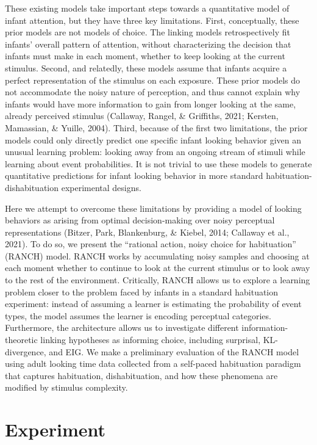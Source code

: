 \documentclass[10pt, letterpaper]{article}
\begin{document}
These existing models take important steps towards a quantitative model
of infant attention, but they have three key limitations. First,
conceptually, these prior models are not models of choice. The linking
models retrospectively fit infants' overall pattern of attention,
without characterizing the decision that infants must make in each
moment, whether to keep looking at the current stimulus. Second, and
relatedly, these models assume that infants acquire a perfect
representation of the stimulus on each exposure. These prior models do
not accommodate the noisy nature of perception, and thus cannot explain
why infants would have more information to gain from longer looking at
the same, already perceived stimulus (Callaway, Rangel, \& Griffiths,
2021; Kersten, Mamassian, \& Yuille, 2004). Third, because of the first
two limitations, the prior models could only directly predict one
specific infant looking behavior given an unusual learning problem:
looking away from an ongoing stream of stimuli while learning about
event probabilities. It is not trivial to use these models to generate
quantitative predictions for infant looking behavior in more standard
habituation-dishabituation experimental designs.

Here we attempt to overcome these limitations by providing a model of
looking behaviors as arising from optimal decision-making over noisy
perceptual representations (Bitzer, Park, Blankenburg, \& Kiebel, 2014;
Callaway et al., 2021). To do so, we present the ``rational action,
noisy choice for habituation'' (RANCH) model. RANCH works by
accumulating noisy samples and choosing at each moment whether to
continue to look at the current stimulus or to look away to the rest of
the environment. Critically, RANCH allows us to explore a learning
problem closer to the problem faced by infants in a standard habituation
experiment: instead of assuming a learner is estimating the probability
of event types, the model assumes the learner is encoding perceptual
categories. Furthermore, the architecture allows us to investigate
different information-theoretic linking hypotheses as informing choice,
including surprisal, KL-divergence, and EIG. We make a preliminary
evaluation of the RANCH model using adult looking time data collected
from a self-paced habituation paradigm that captures habituation,
dishabituation, and how these phenomena are modified by stimulus
complexity.

\hypertarget{experiment}{%
\section{Experiment}\label{experiment}}
\end{document}
